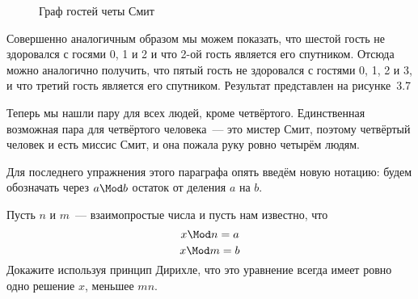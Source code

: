 \begin{example}
\begin{figure}[h]
\caption{Граф гостей четы Смит}
\end{figure}

Совершенно аналогичным образом мы можем показать, что шестой гость не здоровался с госями 0, 1 и 2 и что 2-ой гость является его спутником. Отсюда можно аналогично получить, что пятый гость не здоровался с гостями 0, 1, 2 и 3, и что третий гость является его спутником. Результат представлен на рисунке~3.7

Теперь мы нашли пару для всех людей, кроме четвёртого. Единственная возможная пара для четвёртого человека~--- это мистер Смит, поэтому четвёртый человек и есть миссис Смит, и она пожала руку ровно четырём людям.
\end{example}

Для последнего упражнения этого параграфа опять введём новую нотацию: будем обозначать через $a\Mod b$ остаток от деления $a$ на $b$.

\begin{exercise}
Пусть $n$ и $m$~--- взаимопростые числа и пусть нам известно, что
$$x\Mod n = a$$
$$x\Mod m = b$$
Докажите используя принцип Дирихле, что это уравнение всегда имеет ровно одно решение $x$, меньшее $mn$.
\end{exercise}
